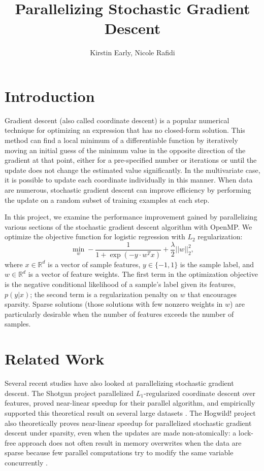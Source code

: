\documentclass{article}
\title{Parallelizing Stochastic Gradient Descent}
\author{Kirstin Early, \qquad Nicole Rafidi}
\begin{document}
\maketitle

\section{Introduction}
Gradient descent (also called coordinate descent) is a popular numerical technique for optimizing an expression that has no closed-form solution. This method can find a local minimum of a differentiable function by iteratively moving an initial guess of the minimum value in the opposite direction of the gradient at that point, either for a pre-specified number or iterations or until the update does not change the estimated value significantly. In the multivariate case, it is possible to update each coordinate individually in this manner. When data are numerous, stochastic gradient descent can improve efficiency by performing the update on a random subset of training examples at each step.

In this project, we examine the performance improvement gained by parallelizing various sections of the stochastic gradient descent algorithm with OpenMP. We optimize the objective function for logistic regression with $L_2$ regularization:
\begin{equation}
\underset{w}{\min}-\frac{1}{1 + \exp(-y \cdot w^T x)} + \frac{\lambda}{2}||w||^2_2,
\end{equation}
where $x \in \mathbb{R}^d$ is a vector of sample features, $y \in \lbrace -1, 1 \rbrace$ is the sample label, and $w \in \mathbb{R}^d$ is a vector of feature weights. The first term in the optimization objective is the negative conditional likelihood of a sample's label given its features, $p(y|x)$; the second term is a regularization penalty on $w$ that encourages sparsity. Sparse solutions (those solutions with few nonzero weights in $w$) are particularly desirable when the number of features exceeds the number of samples.

\section{Related Work}
Several recent studies have also looked at parallelizing stochastic gradient descent. The Shotgun project parallelized $L_1$-regularized coordinate descent over features, proved near-linear speedup for their parallel algorithm, and empirically supported this theoretical result on several large datasets \cite{shotgun2011}. The Hogwild! project also theoretically proves near-linear speedup for parallelized stochastic gradient descent under sparsity, even when the updates are made non-atomically: a lock-free approach does not often result in memory overwrites when the data are sparse because few parallel computations try to modify the same variable concurrently \cite{hogwild2011}.
\end{document}
